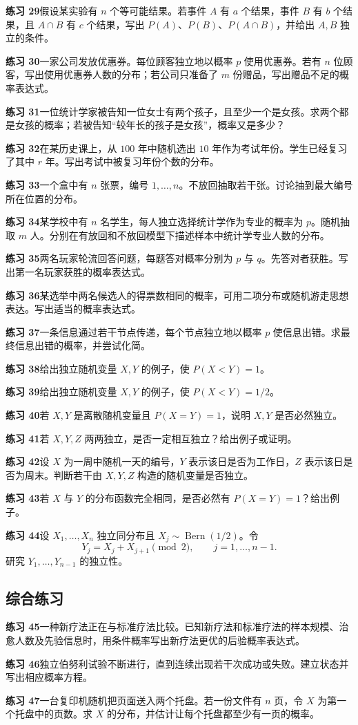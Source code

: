 \documentclass[UTF8, 12pt, fontset=fandol, oneside]{ctexart}
\begin{document}
\noindent\textbf{练习 29}\quad 假设某实验有 $n$ 个等可能结果。若事件 $A$ 有 $a$ 个结果，事件 $B$ 有 $b$ 个结果，且 $A\cap B$ 有 $c$ 个结果，写出 $P(A)$、$P(B)$、$P(A\cap B)$，并给出 $A,B$ 独立的条件。

\noindent\textbf{练习 30}\quad 一家公司发放优惠券。每位顾客独立地以概率 $p$ 使用优惠券。若有 $n$ 位顾客，写出使用优惠券人数的分布；若公司只准备了 $m$ 份赠品，写出赠品不足的概率表达式。

\noindent\textbf{练习 31}\quad 一位统计学家被告知一位女士有两个孩子，且至少一个是女孩。求两个都是女孩的概率；若被告知“较年长的孩子是女孩”，概率又是多少？

\noindent\textbf{练习 32}\quad 在某历史课上，从 $100$ 年中随机选出 $10$ 年作为考试年份。学生已经复习了其中 $r$ 年。写出考试中被复习年份个数的分布。

\noindent\textbf{练习 33}\quad 一个盒中有 $n$ 张票，编号 $1,\ldots,n$。不放回抽取若干张。讨论抽到最大编号所在位置的分布。

\noindent\textbf{练习 34}\quad 某学校中有 $n$ 名学生，每人独立选择统计学作为专业的概率为 $p$。随机抽取 $m$ 人。分别在有放回和不放回模型下描述样本中统计学专业人数的分布。

\noindent\textbf{练习 35}\quad 两名玩家轮流回答问题，每题答对概率分别为 $p$ 与 $q$。先答对者获胜。写出第一名玩家获胜的概率表达式。

\noindent\textbf{练习 36}\quad 某选举中两名候选人的得票数相同的概率，可用二项分布或随机游走思想表达。写出适当的概率表达式。

\noindent\textbf{练习 37}\quad 一条信息通过若干节点传递，每个节点独立地以概率 $p$ 使信息出错。求最终信息出错的概率，并尝试化简。

\noindent\textbf{练习 38}\quad 给出独立随机变量 $X,Y$ 的例子，使 $P(X<Y)=1$。

\noindent\textbf{练习 39}\quad 给出独立随机变量 $X,Y$ 的例子，使 $P(X<Y)=1/2$。

\noindent\textbf{练习 40}\quad 若 $X,Y$ 是离散随机变量且 $P(X=Y)=1$，说明 $X,Y$ 是否必然独立。

\noindent\textbf{练习 41}\quad 若 $X,Y,Z$ 两两独立，是否一定相互独立？给出例子或证明。

\noindent\textbf{练习 42}\quad 设 $X$ 为一周中随机一天的编号，$Y$ 表示该日是否为工作日，$Z$ 表示该日是否为周末。判断若干由 $X,Y,Z$ 构造的随机变量是否独立。

\noindent\textbf{练习 43}\quad 若 $X$ 与 $Y$ 的分布函数完全相同，是否必然有 $P(X=Y)=1$？给出例子。

\noindent\textbf{练习 44}\quad 设 $X_1,\ldots,X_n$ 独立同分布且 $X_j\sim\operatorname{Bern}(1/2)$。令
\[
  Y_j=X_j+X_{j+1}\pmod 2,\qquad j=1,\ldots,n-1.
\]
研究 $Y_1,\ldots,Y_{n-1}$ 的独立性。

\subsection*{综合练习}

\noindent\textbf{练习 45}\quad 一种新疗法正在与标准疗法比较。已知新疗法和标准疗法的样本规模、治愈人数及先验信息时，用条件概率写出新疗法更优的后验概率表达式。

\noindent\textbf{练习 46}\quad 独立伯努利试验不断进行，直到连续出现若干次成功或失败。建立状态并写出相应概率方程。

\noindent\textbf{练习 47}\quad 一台复印机随机把页面送入两个托盘。若一份文件有 $n$ 页，令 $X$ 为第一个托盘中的页数。求 $X$ 的分布，并估计让每个托盘都至少有一页的概率。
\end{document}

